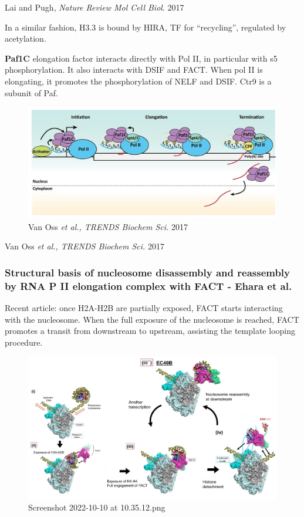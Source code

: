 Lai and Pugh, \emph{Nature Review Mol Cell Biol}. 2017

In a similar fashion, H3.3 is bound by HIRA, TF for ``recycling'', regulated by acetylation.

\textbf{Paf1C} elongation factor interacts directly with Pol II, in particular with s5 phosphorylation. It also interacts with DSIF and FACT. When pol II is elongating, it promotes the phosphorylation of NELF and DSIF. Ctr9 is a subunit of Paf.

\begin{figure}
\centering
\includegraphics[width=\textwidth]{../_resources/Screenshot_2022-10-05_at_23-05-58.png}
\caption{Van Oss \emph{et al., TRENDS Biochem Sci.} 2017}
\end{figure}

Van Oss \emph{et al., TRENDS Biochem Sci.} 2017

\hypertarget{structural-basis-of-nucleosome-disassembly-and-reassembly-by-rna-p-ii-elongation-complex-with-fact---ehara-et-al.}{%
\subsubsection{Structural basis of nucleosome disassembly and reassembly by RNA P II elongation complex with FACT - Ehara et al.}\label{structural-basis-of-nucleosome-disassembly-and-reassembly-by-rna-p-ii-elongation-complex-with-fact---ehara-et-al.}}

Recent article: once H2A-H2B are partially exposed, FACT starts interacting with the nucleosome. When the full exposure of the nucleosome is reached, FACT promotes a transit from downstream to upstream, assisting the template looping procedure.

\begin{figure}
\centering
\includegraphics[width=\textwidth]{../_resources/Screenshot_2022-10-10_at_10-35-12.png}
\caption{Screenshot 2022-10-10 at 10.35.12.png}
\end{figure}

